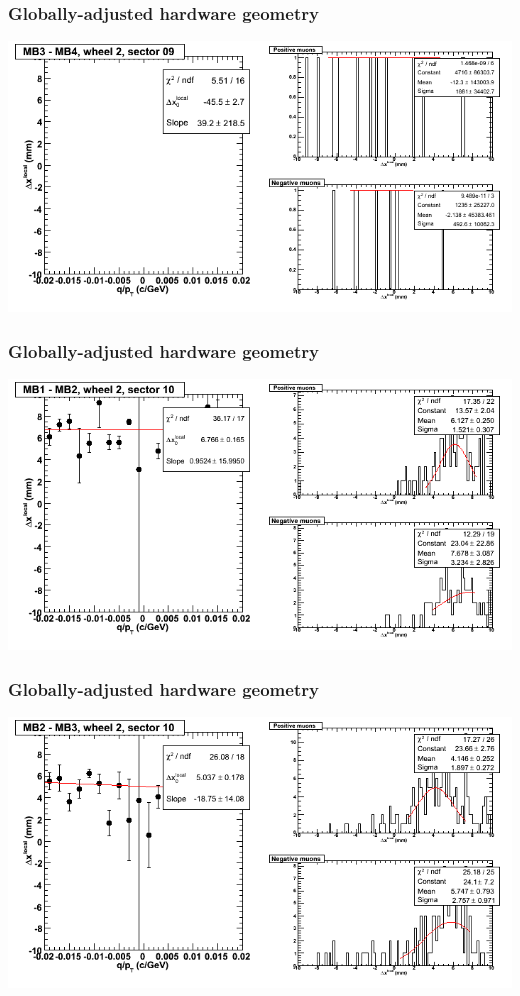 \documentclass[compress]{beamer}
\begin{document}
\begin{frame}
\frametitle{Globally-adjusted hardware geometry}
\includegraphics[width=\linewidth]{NOV4_segdiffs_HW/dt13_resid_E_09_34.png}
\end{frame}

\begin{frame}
\frametitle{Globally-adjusted hardware geometry}
\includegraphics[width=\linewidth]{NOV4_segdiffs_HW/dt13_resid_E_10_12.png}
\end{frame}

\begin{frame}
\frametitle{Globally-adjusted hardware geometry}
\includegraphics[width=\linewidth]{NOV4_segdiffs_HW/dt13_resid_E_10_23.png}
\end{frame}
\end{document}
